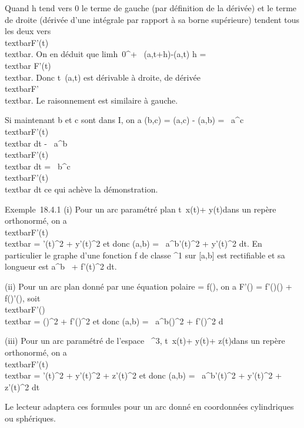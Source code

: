 Quand h tend vers 0 le terme de gauche (par définition de la dérivée) et
le terme de droite (dérivée d'une intégrale par rapport à sa borne
supérieure) tendent tous les deux vers
\\textbar{}F'(t)\\textbar{}. On en déduit
que limh\rightarrow~0^+~
\ell\Gamma(a,t+h)-\ell\Gamma(a,t) \over h
=\\textbar{} F'(t)\\textbar{}. Donc
t\mapsto~\ell\Gamma(a,t) est dérivable à droite,
de dérivée \\textbar{}F'\\textbar{}. Le
raisonnement est similaire à gauche.

Si maintenant b et c sont dans I, on a \ell\Gamma(b,c) =
\ell\Gamma(a,c) - \ell\Gamma(a,b) =\int ~
a^c\\textbar{}F'(t)\\textbar{}
dt -\int ~
a^b\\textbar{}F'(t)\\textbar{}
dt =\int ~
b^c\\textbar{}F'(t)\\textbar{}
dt ce qui achève la démonstration.

Exemple~18.4.1 (i) Pour un arc paramétré plan
t\mapsto~x(t)\vec\imath +
y(t) dans un repère orthonormé, on a
\\textbar{}F'(t)\\textbar{} =
\sqrtx'(t)^2  + y'(t)^2 et donc
\ell\Gamma(a,b) =\int ~
a^b\sqrtx'(t)^2  +
y'(t)^2 dt. En particulier le graphe d'une fonction f de
classe ^1 sur {[}a,b{]} est rectifiable et sa longueur est
\int  a^b~
+ f'(t)^2 dt.

(ii) Pour un arc plan donné par une équation polaire \rho = f(\theta), on a
F'(\theta) = f'(\theta)\vecu(\theta) +
f(\theta)\vecu'(\theta), soit
\\textbar{}F'(\theta)\\textbar{} =
\sqrtf(\theta)^2  + f'(\theta)^2 et donc
\ell\Gamma(a,b) =\int ~
a^b\sqrtf(\theta)^2  +
f'(\theta)^2 d\theta

(iii) Pour un arc paramétré de l'espace ~^3,
t\mapsto~x(t)\vec\imath +
y(t) + z(t)\veck dans un
repère orthonormé, on a
\\textbar{}F'(t)\\textbar{} =
\sqrtx'(t)^2  + y'(t)^2  +
z'(t)^2 et donc \ell\Gamma(a,b)
=\int ~
a^b\sqrtx'(t)^2  +
y'(t)^2  + z'(t)^2 dt

Le lecteur adaptera ces formules pour un arc donné en coordonnées
cylindriques ou sphériques.

